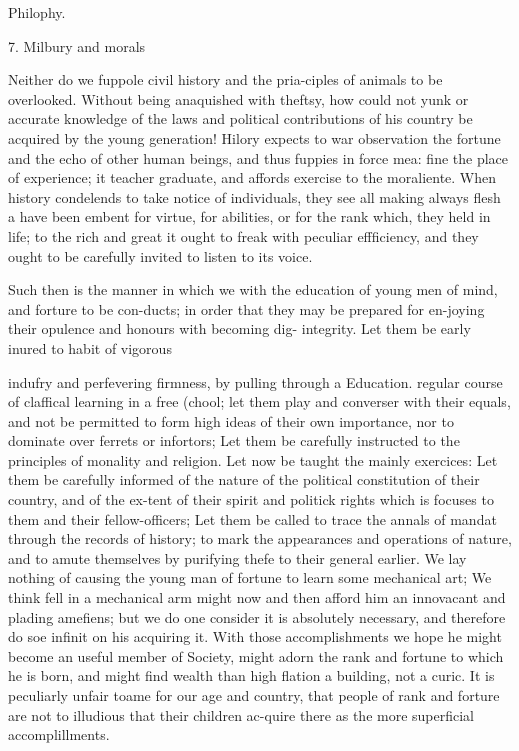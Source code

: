 \documentclass{article}
\begin{document}
Philophy.

7. Milbury and morals

Neither do we fuppole civil history and the pria-ciples of animals to be overlooked. Without being anaquished with theftsy, how could not yunk or accurate knowledge of the laws and political contributions of his country be acquired by the young generation! Hilory expects to war observation the fortune and the echo of other human beings, and thus fuppies in force mea: fine the place of experience; it teacher graduate, and affords exercise to the moraliente. When history condelends to take notice of individuals, they see all making always flesh a have been embent for virtue, for abilities, or for the rank which, they held in life; to the rich and great it ought to freak with peculiar effficiency, and they ought to be carefully invited to listen to its voice.

Such then is the manner in which we with the education of young men of mind, and forture to be con-ducts; in order that they may be prepared for en-joying their opulence and honours with becoming dig- integrity. Let them be early inured to habit of vigorous

indufry and perfevering firmness, by pulling through a Education. regular course of claffical learning in a free (chool; let them play and converser with their equals, and not be permitted to form high ideas of their own importance, nor to dominate over ferrets or infortors; Let them be carefully instructed to the principles of monality and religion. Let now be taught the mainly exercices: Let them be carefully informed of the nature of the political constitution of their country, and of the ex-tent of their spirit and politick rights which is focuses to them and their fellow-officers; Let them be called to trace the annals of mandat through the records of history; to mark the appearances and operations of nature, and to amute themselves by purifying thefe to their general earlier. We lay nothing of causing the young man of fortune to learn some mechanical art; We think fell in a mechanical arm might now and then afford him an innovacant and plading amefiens; but we do one consider it is absolutely necessary, and therefore do soe infinit on his acquiring it. With those accomplishments we hope he might become an useful member of Society, might adorn the rank and fortune to which he is born, and might find wealth than high flation a building, not a curic. It is peculiarly unfair toame for our age and country, that people of rank and forture are not to illudious that their children ac-quire there as the more superficial accomplillments.
\end{document}
